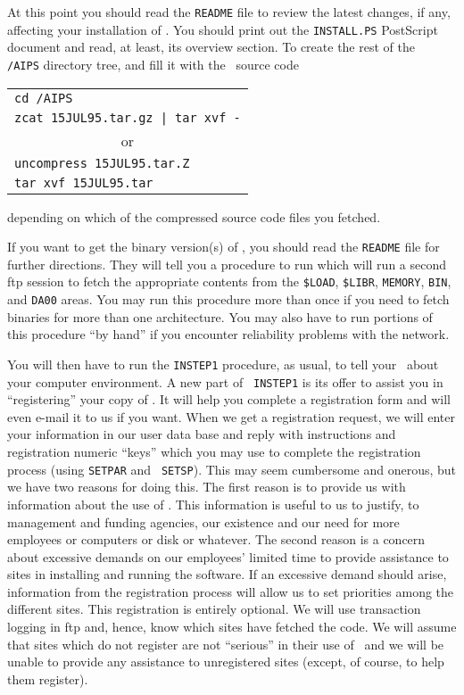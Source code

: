 At this point you should read the {\tt README} file to review the
latest changes, if any, affecting your installation of \hbox{\AIPS}.
You should print out the {\tt INSTALL.PS} PostScript document and
read, at least, its overview section.  To create the rest of the {\tt
/AIPS} directory tree, and fill it with the \AIPS\ source code
\vskip -10pt
\begin{center}
\begin{tabular}{l}
   {\tt cd /AIPS} \\
   {\tt zcat 15JUL95.tar.gz | tar xvf -} \\
\multicolumn{1}{c}{or} \\
   {\tt uncompress 15JUL95.tar.Z} \\
   {\tt tar xvf 15JUL95.tar}
\end{tabular}
\end{center}
\vskip -10pt
depending on which of the compressed source code files you fetched.

If you want to get the binary version(s) of \AIPS, you should read the
{\tt README} file for further directions.  They will tell you a
procedure to run which will run a second ftp session to fetch the
appropriate contents from the {\tt \$LOAD}, {\tt \$LIBR}, {\tt MEMORY},
{\tt BIN}, and {\tt DA00} areas.  You may run this procedure more than
once if you need to fetch binaries for more than one architecture.
You may also have to run portions of this procedure ``by hand'' if you
encounter reliability problems with the network.

You will then have to run the {\tt INSTEP1} procedure, as usual, to
tell your \AIPS\ about your computer environment.  A new part of {\tt
INSTEP1} is its offer to assist you in ``registering'' your copy of
\hbox{\AIPS}.  It will help you complete a registration form and will
even e-mail it to us if you want.  When we get a registration request,
we will enter your information in our user data base and reply with
instructions and registration numeric ``keys'' which you may use to
complete the registration process (using {\tt SETPAR} and \hbox{{\tt
SETSP}}).  This may seem cumbersome and onerous, but we have two
reasons for doing this.  The first reason is to provide us with
information about the use of \hbox{\AIPS}.  This information is useful
to us to justify, to management and funding agencies, our existence
and our need for more employees or computers or disk or whatever.  The
second reason is a concern about excessive demands on our employees'
limited time to provide assistance to sites in installing and running
the software.  If an excessive demand should arise, information from
the registration process will allow us to set priorities among the
different sites.  This registration is entirely optional.  We will use
transaction logging in ftp and, hence, know which sites have fetched
the code.  We will assume that sites which do not register are not
``serious'' in their use of \AIPS\ and we will be unable to provide
any assistance to unregistered sites (except, of course, to help them
register).

